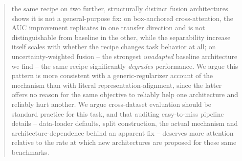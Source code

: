 \documentclass[conference]{IEEEtran}
\begin{document}
\begin{abstract}
  the same recipe on two further, structurally distinct fusion
  architectures shows it is not a general-purpose fix: on box-anchored
  cross-attention, the AUC improvement replicates in one transfer
  direction and is not distinguishable from baseline in the other,
  while the separability increase itself scales with whether the recipe
  changes task behavior at all; on uncertainty-weighted fusion -- the
  strongest \emph{unadapted} baseline architecture we find -- the same
  recipe significantly \emph{degrades} performance. We argue this
  pattern is more consistent with a generic-regularizer account of the
  mechanism than with literal representation-alignment, since the
  latter offers no reason for the same objective to reliably help one
  architecture and reliably hurt another. We argue cross-dataset
  evaluation should be standard practice for this task, and that
  auditing easy-to-miss pipeline details -- data-loader defaults, split
  construction, the actual mechanism and architecture-dependence behind
  an apparent fix -- deserves more attention relative to the rate at
  which new architectures are proposed for these same benchmarks.
\end{abstract}













\end{document}
